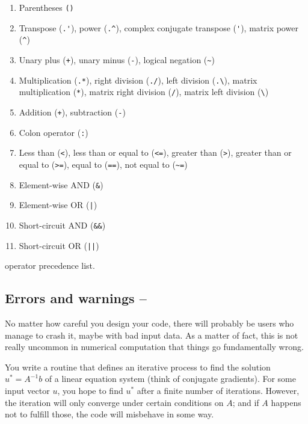 \begin{table}
\begin{enumerate}
\item Parentheses \lstinline!()!
\item Transpose (\lstinline!.'!), power (\lstinline!.^!), complex conjugate transpose (\lstinline!'!), matrix power (\lstinline!^!)
\item Unary plus (\lstinline!+!), unary minus (\lstinline!-!), logical negation (\lstinline!~!)
\item Multiplication (\lstinline!.*!), right division (\lstinline!./!), left division (\lstinline!.\!), matrix multiplication (\lstinline!*!), matrix right division (\lstinline!/!), matrix left division (\lstinline!\!)
\item Addition (\lstinline!+!), subtraction (\lstinline!-!)
\item Colon operator (\lstinline!:!)
\item Less than (\lstinline!<!), less than or equal to (\lstinline!<=!), greater than (\lstinline!>!), greater than or equal to (\lstinline!>=!), equal to (\lstinline!==!), not equal to (\lstinline!~=!)
\item Element-wise AND (\lstinline!&!)
\item Element-wise OR (\lstinline!|!)
\item Short-circuit AND (\lstinline!&&!)
\item Short-circuit OR (\lstinline!||!)
\end{enumerate}
\caption{\matlab{} operator precedence list.}
\label{table:operator-precedence}
\end{table}


\subsection{Errors and warnings -- \cleansymbol\cleansymbol}

No matter how careful you design your code, there will probably be users who manage to crash it, maybe with bad input data. As a matter of fact, this is not really uncommon in numerical computation that things go fundamentally wrong.

\begin{example}
You write a routine that defines an iterative process to find the solution
$u^* = A^{-1}b$ of a linear equation system (think of conjugate gradients).
For some input vector $u$, you hope to find $u^*$ after a finite number of
iterations. However, the iteration will only converge under certain conditions
on $A$; and if $A$ happens not to fulfill those, the code will misbehave in
some way.
\end{example}

